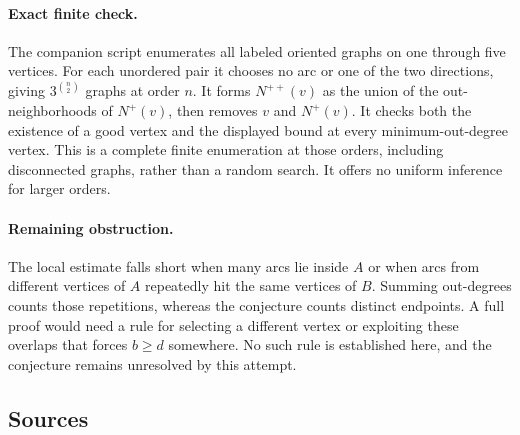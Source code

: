 \documentclass[11pt,a4paper]{article}
\begin{document}
\paragraph{Exact finite check.}
The companion script enumerates all labeled oriented graphs on one
through five vertices. For each unordered pair it chooses no arc or one
of the two directions, giving $3^{\binom n2}$ graphs at order $n$.
It forms $N^{++}(v)$ as the union of the out-neighborhoods of $N^+(v)$,
then removes $v$ and $N^+(v)$. It checks both the existence of a good
vertex and the displayed bound at every minimum-out-degree vertex.
This is a complete finite enumeration at those orders, including
disconnected graphs, rather than a random search. It offers no
uniform inference for larger orders.

\paragraph{Remaining obstruction.}
The local estimate falls short when many arcs lie inside $A$ or when
arcs from different vertices of $A$ repeatedly hit the same vertices
of $B$. Summing out-degrees counts those repetitions, whereas the
conjecture counts distinct endpoints. A full proof would need a rule
for selecting a different vertex or exploiting these overlaps that
forces $b\geq d$ somewhere. No such rule is established here, and
the conjecture remains unresolved by this attempt.

\subsection{Sources}
\end{document}
